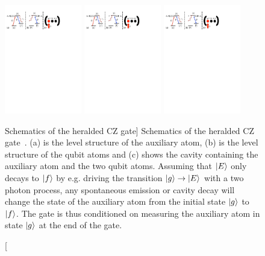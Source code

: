 \begin{figure}
\centering
\includegraphics[width=0.3\textwidth]{./figs_Borregaard_PRA2015/figure3a}
\includegraphics[width=0.3\textwidth]{./figs_Borregaard_PRA2015/figure3b}
\includegraphics[width=0.3\textwidth]{./figs_Borregaard_PRA2015/figure3c}
\caption
[Schematics of the heralded CZ gate]
{ Schematics of the heralded CZ gate~\cite{Borregaard2015a}. (a) is the level
structure of the auxiliary atom, (b) is the level structure of the qubit atoms
and (c) shows the cavity containing the auxiliary atom and the two qubit atoms.
Assuming that $| E \rangle$ only decays to $| f \rangle$ by e.g. driving the transition
$| g \rangle\to| E \rangle$ with a two photon process, any spontaneous emission or
cavity decay will change the state of the auxiliary atom from the initial state
$| g \rangle$ to $| f \rangle$. The gate is thus conditioned on measuring the auxiliary
atom in state $| g \rangle$ at the end of the gate.}
\label{fig:figure3}
\end{figure}

